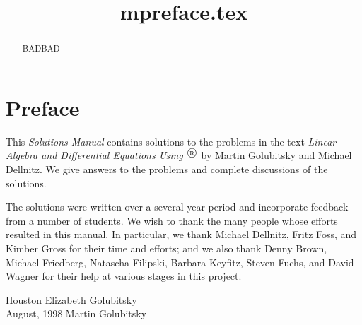 \documentclass{ximera}
\title{mpreface.tex}
\begin{document}
\begin{abstract}
BADBAD
\end{abstract}
\maketitle

\large

\section*{Preface}

This {\em Solutions Manual\/} contains solutions to the problems 
in the text {\em Linear Algebra and Differential Equations Using
\Matlabp$^\tm$} by Martin Golubitsky and Michael Dellnitz.  We give 
answers to the problems and complete discussions of the solutions.

\quad The solutions were written over a several year period and incorporate
feedback from a number of students.   We wish to thank the many people whose 
efforts resulted in this manual.  In particular, we thank Michael Dellnitz,  
Fritz Foss, and Kimber Gross for their time and efforts; and we also thank 
Denny Brown, Michael Friedberg, Natascha Filipski, Barbara Keyfitz, Steven 
Fuchs, and David Wagner for their help at various stages in this project.

\vspace{0.2in}

\noindent Houston \hfill Elizabeth Golubitsky \\
August, 1998  \hfill Martin Golubitsky



\normalsize
\end{document}
